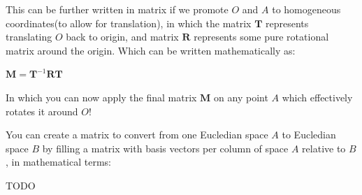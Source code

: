 This can be further written in matrix if we promote $O$ and $A$ to homogeneous coordinates(to allow for translation),
in which the matrix $\textbf{T}$ represents translating $O$ back to origin, and matrix $\textbf{R}$ represents
some pure rotational matrix around the origin. Which can be written mathematically as:
\begin{center}
    $\textbf{M}=\textbf{T}^{-1}\textbf{R}\textbf{T}$
\end{center}

In which you can now apply the final matrix $\textbf{M}$ on any point $A$ which effectively rotates it around $O$!

\sgap
You can create a matrix to convert from one Eucledian space $A$ to Eucledian space $B$ by filling a matrix with
basis vectors per column of space $A$ relative to $B$, in mathematical terms:

TODO



